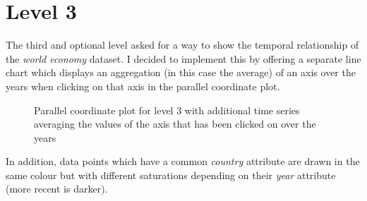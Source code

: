 \documentclass[]{article}
\begin{document}
\section*{Level 3}
The third and optional level asked for a way to show the temporal relationship of the \emph{world economy} dataset. I decided to implement this by offering a separate line chart which displays an aggregation (in this case the average) of an axis over the years when clicking on that axis in the parallel coordinate plot. 

\begin{figure}[h]
	
	\centering
	\caption{Parallel coordinate plot for level 3 with additional time series averaging the values of the axis that has been clicked on over the years}
\end{figure}

In addition, data points which have a common \emph{country} attribute are drawn in the same colour but with different saturations depending on their \emph{year} attribute (more recent is darker). 
\end{document}
